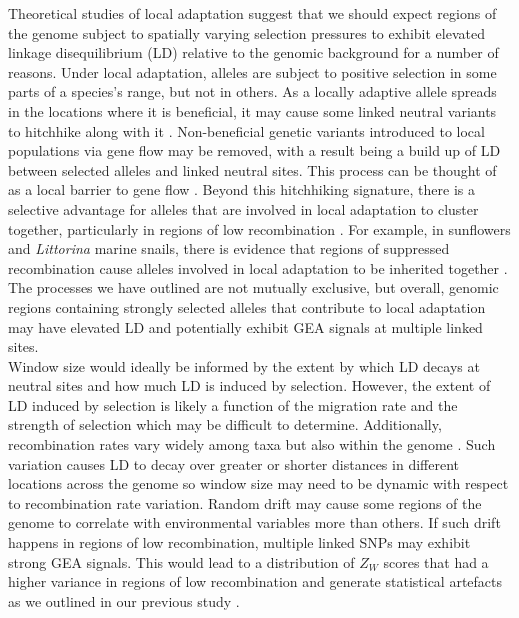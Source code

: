 \documentclass[10pt,twoside,lineno]{GSA_format}
\begin{document}
Theoretical studies of local adaptation suggest that we should expect regions of the genome subject to spatially varying selection pressures to exhibit elevated linkage disequilibrium (LD) relative to the genomic background for a number of reasons. Under local adaptation, alleles are subject to positive selection in some parts of a species's range, but not in others. As a locally adaptive allele spreads in the locations where it is beneficial, it may cause some linked neutral variants to hitchhike along with it \citep{Sakamoto2019}. Non-beneficial genetic variants introduced to local populations via gene flow may be removed, with a result being a build up of LD between selected alleles and linked neutral sites. This process can be thought of as a local barrier to gene flow \citep{Barton1986}. Beyond this hitchhiking signature, there is a selective advantage for alleles that are involved in local adaptation to cluster together, particularly in regions of low recombination \citep{Rieseberg2001, Noor2001, Kirkpatrick2006, Yeaman2013}. For example, in sunflowers and \textit{Littorina} marine snails, there is evidence that regions of suppressed recombination cause alleles involved in local adaptation to be inherited together \citep{Morales2019, Todesco2020}. The processes we have outlined are not mutually exclusive, but overall, genomic regions containing strongly selected alleles that contribute to local adaptation may have elevated LD and potentially exhibit GEA signals at multiple linked sites.\\

Window size would ideally be informed by the extent by which LD decays at neutral sites and how much LD is induced by selection. However, the extent of LD induced by selection is likely a function of the migration rate and the strength of selection  which may be difficult to determine. Additionally, recombination rates vary widely among taxa but also within the genome \citep{Stapley2017}. Such variation causes LD to decay over greater or shorter distances in different locations across the genome so window size may need to be dynamic with respect to recombination rate variation. Random drift may cause some regions of the genome to correlate with environmental variables more than others. If such drift happens in regions of low recombination, multiple linked SNPs may exhibit strong GEA signals. This would lead to a distribution of $Z_W$ scores that had a higher variance in regions of low recombination and generate statistical artefacts as we outlined in our previous study \citep{Booker2020}. 
\end{document}
